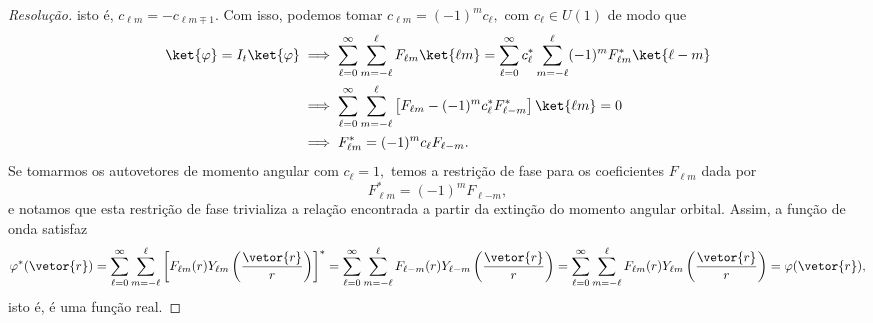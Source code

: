 \begin{proof}[Resolução]
    isto é, \(c_{\ell m} = - c_{\ell m \mp 1}.\) Com isso, podemos tomar \(c_{\ell m} = (-1)^{m} c_{\ell},\) com \(c_{\ell} \in U(1)\) de modo que
    \begin{align*}
        \ket{\varphi} = I_t \ket{\varphi} &\implies \sum_{\ell = 0}^{\infty} \sum_{m = -\ell}^{\ell} F_{\ell m} \ket{\ell m} = \sum_{\ell = 0}^\infty c_{\ell}^* \sum_{m = -\ell}^{\ell}  (-1)^{m} F^*_{\ell m}\ket{\ell - m}\\
                                          &\implies \sum_{\ell = 0}^{\infty} \sum_{m = -\ell}^{\ell} \left[F_{\ell m} - (-1)^m c^*_\ell F^*_{\ell {-m}}\right] \ket{\ell m} = 0\\
                                          &\implies F^*_{\ell m} = (-1)^m c_{\ell} F_{\ell {-m}}.
    \end{align*}
    Se tomarmos os autovetores de momento angular com \(c_{\ell} = 1,\) temos a restrição de fase para os coeficientes \(F_{\ell m}\) dada por
    \begin{equation*}
        F_{\ell m}^* = (-1)^m F_{\ell {-m}},
    \end{equation*}
    e notamos que esta restrição de fase trivializa a relação encontrada a partir da extinção do momento angular orbital. Assim, a função de onda satisfaz
    \begin{equation*}
        \varphi^*(\vetor{r}) = \sum_{\ell = 0}^\infty \sum_{m = -\ell}^\ell \left[F_{\ell m}(r) Y_{\ell m}\left(\frac{\vetor{r}}{r}\right)\right]^* = \sum_{\ell = 0}^\infty \sum_{m = -\ell}^\ell F_{\ell {-m}}(r) Y_{\ell {-m}}\left(\frac{\vetor{r}}{r}\right) = \sum_{\ell = 0}^\infty \sum_{m = -\ell}^{\ell} F_{\ell m}(r) Y_{\ell m}\left(\frac{\vetor{r}}{r}\right) = \varphi(\vetor{r}),
    \end{equation*}
    isto é, é uma função real.
\end{proof}

